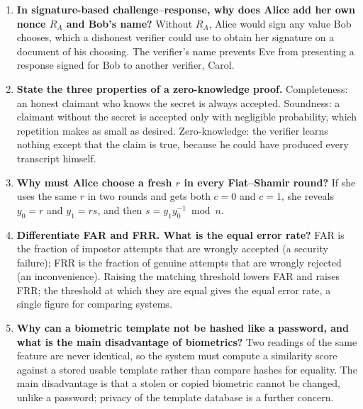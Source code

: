 \begin{enumerate}[leftmargin=1.6em,itemsep=3pt]
  \item \textbf{In signature-based challenge--response, why does Alice add her own nonce $R_A$ and Bob's name?} Without $R_A$, Alice would sign any value Bob chooses, which a dishonest verifier could use to obtain her signature on a document of his choosing. The verifier's name prevents Eve from presenting a response signed for Bob to another verifier, Carol.
  \item \textbf{State the three properties of a zero-knowledge proof.} Completeness: an honest claimant who knows the secret is always accepted. Soundness: a claimant without the secret is accepted only with negligible probability, which repetition makes as small as desired. Zero-knowledge: the verifier learns nothing except that the claim is true, because he could have produced every transcript himself.
  \item \textbf{Why must Alice choose a fresh $r$ in every Fiat--Shamir round?} If she uses the same $r$ in two rounds and gets both $c = 0$ and $c = 1$, she reveals $y_0 = r$ and $y_1 = rs$, and then $s = y_1 y_0^{-1} \bmod n$.
  \item \textbf{Differentiate FAR and FRR. What is the equal error rate?} FAR is the fraction of impostor attempts that are wrongly accepted (a security failure); FRR is the fraction of genuine attempts that are wrongly rejected (an inconvenience). Raising the matching threshold lowers FAR and raises FRR; the threshold at which they are equal gives the equal error rate, a single figure for comparing systems.
  \item \textbf{Why can a biometric template not be hashed like a password, and what is the main disadvantage of biometrics?} Two readings of the same feature are never identical, so the system must compute a similarity score against a stored usable template rather than compare hashes for equality. The main disadvantage is that a stolen or copied biometric cannot be changed, unlike a password; privacy of the template database is a further concern.
\end{enumerate}

